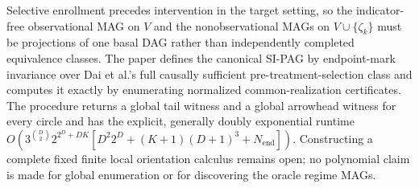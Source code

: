 Selective enrollment precedes intervention in the target setting, so the indicator-free observational MAG on \(V\) and the nonobservational MAGs on \(V\cup\{\zeta_k\}\) must be projections of one basal DAG rather than independently completed equivalence classes.  The paper defines the canonical SI-PAG by endpoint-mark invariance over Dai et al.'s full causally sufficient pre-treatment-selection class and computes it exactly by enumerating normalized common-realization certificates.  The procedure returns a global tail witness and a global arrowhead witness for every circle and has the explicit, generally doubly exponential runtime \(O\!\left(3^{\binom D2}2^{2^D+DK}[D^2 2^D+(K+1)(D+1)^3+N_{\mathrm{end}}]\right)\).  Constructing a complete fixed finite local orientation calculus remains open; no polynomial claim is made for global enumeration or for discovering the oracle regime MAGs.